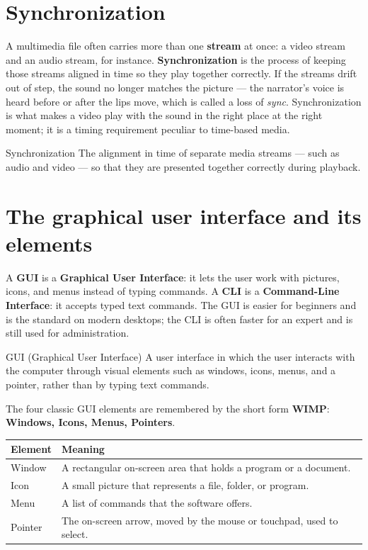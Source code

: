 \section{Synchronization}
A multimedia file often carries more than one \textbf{stream} at once: a video
stream and an audio stream, for instance. \textbf{Synchronization} is the
process of keeping those streams aligned in time so they play together
correctly. If the streams drift out of step, the sound no longer matches the
picture --- the narrator's voice is heard before or after the lips move, which
is called a loss of \emph{sync}. Synchronization is what makes a video play
with the sound in the right place at the right moment; it is a timing
requirement peculiar to time-based media.

\begin{definitionbox}{Synchronization}
The alignment in time of separate media streams --- such as audio and video
--- so that they are presented together correctly during playback.
\end{definitionbox}

\section{The graphical user interface and its elements}
A \textbf{GUI} is a \textbf{Graphical User Interface}: it lets the user work
with pictures, icons, and menus instead of typing commands. A \textbf{CLI} is
a \textbf{Command-Line Interface}: it accepts typed text commands. The GUI is
easier for beginners and is the standard on modern desktops; the CLI is often
faster for an expert and is still used for administration.

\begin{definitionbox}{GUI (Graphical User Interface)}
A user interface in which the user interacts with the computer through visual
elements such as windows, icons, menus, and a pointer, rather than by typing
text commands.
\end{definitionbox}

The four classic GUI elements are remembered by the short form \textbf{WIMP}:
\textbf{Windows, Icons, Menus, Pointers}.

\begin{center}
\begin{tabular}{p{}p{}}
\toprule
\textbf{Element} & \textbf{Meaning} \\
\midrule
Window & A rectangular on-screen area that holds a program or a document. \\
Icon & A small picture that represents a file, folder, or program. \\
Menu & A list of commands that the software offers. \\
Pointer & The on-screen arrow, moved by the mouse or touchpad, used to select. \\
\bottomrule
\end{tabular}
\end{center}

